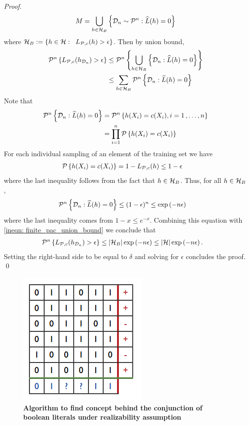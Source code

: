 \documentclass[11pt]{article}
\begin{document}
\begin{itemize}
\begin{proof}
\begin{align*}
M = \bigcup_{h \in {\mathcal H}_B}\left\{{\mathcal D}_n \sim {\mathcal P}^n:  \widehat{L}(h) = 0\right\}
\end{align*} where ${\mathcal H}_B := \left\{h \in {\mathcal H}: \;\; L_{{\mathcal P}, c}(h) > \epsilon\right\}$. Then by union bound,
\begin{align}
{\mathcal P}^n\left\{L_{{\mathcal P}, c}(h_{{\mathcal D}_n }) > \epsilon\right\} &\le  {\mathcal P}^n\left\{ \bigcup_{h \in {\mathcal H}_B}\left\{{\mathcal D}_n:  \widehat{L}(h) = 0\right\}\right\}  \nonumber\\
&\le \sum_{h \in {\mathcal H}_B}{\mathcal P}^n\left\{{\mathcal D}_n:  \widehat{L}(h) = 0\right\} \label{ineqn: finite_pac_union_bound}
\end{align} Note that 
\begin{align*}
{\mathcal P}^n\left\{{\mathcal D}_n:  \widehat{L}(h) = 0\right\} &= {\mathcal P}^n\left\{h(X_i) = c(X_i), i =1 \,{,}\ldots{,}\, n\right\}\\
&= \prod_{i=1}^{n}{\mathcal P}\left\{h(X_i) = c(X_i)\right\}
\end{align*} For each individual sampling of an element of the training set we have
\begin{align*}
{\mathcal P}\left\{h(X_i) = c(X_i)\right\} &= 1 - L_{{\mathcal P}, c}(h) \le 1- \epsilon
\end{align*} where the last inequality follows from the fact that $h \in {\mathcal H}_B$. Thus, for all $h \in {\mathcal H}_B$,
\begin{align*}
{\mathcal P}^n\left\{{\mathcal D}_n:  \widehat{L}(h) = 0\right\} &\le (1 - \epsilon)^n \le \exp\left(- n \epsilon\right)
\end{align*} where the last inequality comes from $1 - x \le e^{-x}$. Combining this equation with \eqref{ineqn: finite_pac_union_bound} we conclude that
\begin{align*}
{\mathcal P}^n\left\{L_{{\mathcal P}, c}(h_{{\mathcal D}_n }) > \epsilon\right\} &\le  \left\lvert {\mathcal H}_B \right\rvert\exp\left(- n \epsilon\right) \le \left\lvert {\mathcal H} \right\rvert\exp\left(- n \epsilon\right).
\end{align*} Setting the right-hand side to be equal to $\delta$ and solving for $\epsilon$ concludes the proof. \qed
\end{proof}

\begin{figure}
\begin{minipage}[t]{1\linewidth}
  \centering
  \centerline{\includegraphics[scale = 0.6]{conjunction_boolean_literals.png}}
\end{minipage}
\caption{\footnotesize{\textbf{Algorithm to find concept behind the conjunction of boolean literals under realizability assumption \citep{mohri2018foundations}}}}
\label{fig: conjunction_boolean_literals}
\end{figure}



\end{itemize}
\end{document}
